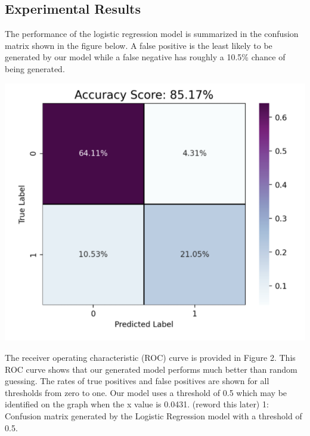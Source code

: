 \documentclass{article}
\begin{document}
\subsection*{Experimental Results}

\quad The performance of the logistic regression model is summarized in the confusion matrix shown in the figure below. A false positive is the least likely to be generated by our model while a false negative has roughly a 10.5\% chance of being generated. 

\begin{center}
\includegraphics[scale=.60]{confusion_matrix.png}\\
\end{center}
\quad The receiver operating characteristic (ROC) curve is provided in Figure 2. This ROC curve shows that our generated model performs much better than random guessing. The rates of true positives and false positives are shown for all thresholds from zero to one. Our model uses a threshold of 0.5 which may be identified on the graph when the x value is 0.0431. (reword this later)
 1: Confusion matrix generated by the Logistic Regression model with a threshold of 0.5.
\end{document}
